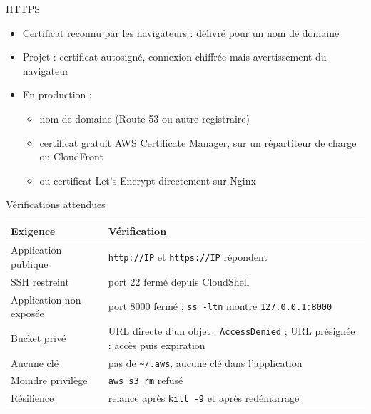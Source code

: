\begin{frame}{HTTPS}
  \begin{itemize}
    \setlength{\itemsep}{.55em}
    \item Certificat reconnu par les navigateurs : délivré pour un nom de domaine
    \item Projet : certificat autosigné, connexion chiffrée mais avertissement du navigateur
    \item En production :
    \begin{itemize}
      \item nom de domaine (Route 53 ou autre registraire)
      \item certificat gratuit AWS Certificate Manager, sur un répartiteur de charge ou CloudFront
      \item ou certificat Let's Encrypt directement sur Nginx
    \end{itemize}
  \end{itemize}
\end{frame}

\begin{frame}{Vérifications attendues}
  \renewcommand{\arraystretch}{1.15}
  \begin{tabularx}{\textwidth}{@{}>{\raggedright\arraybackslash}p{4.6cm}>{\raggedright\arraybackslash}X@{}}
    \toprule
    \textbf{Exigence} & \textbf{Vérification} \\ \midrule
    Application publique & \texttt{http://IP} et \texttt{https://IP} répondent \\
    SSH restreint & port 22 fermé depuis CloudShell \\
    Application non exposée & port 8000 fermé ; \texttt{ss -ltn} montre \texttt{127.0.0.1:8000} \\
    Bucket privé & URL directe d'un objet : \texttt{AccessDenied} ; URL présignée : accès puis expiration \\
    Aucune clé & pas de \texttt{\textasciitilde/.aws}, aucune clé dans l'application \\
    Moindre privilège & \texttt{aws s3 rm} refusé \\
    Résilience & relance après \texttt{kill -9} et après redémarrage \\ \bottomrule
  \end{tabularx}
\end{frame}


